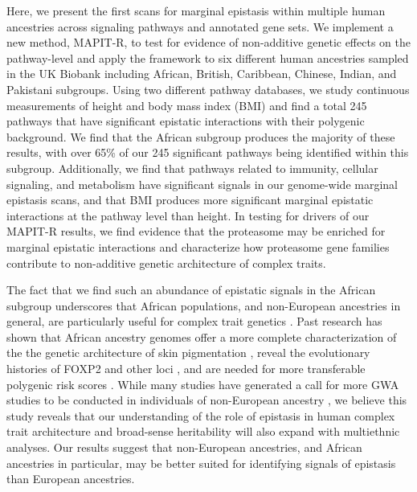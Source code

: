 \documentclass[10pt,a4paper]{article}
\begin{document}
Here, we present the first scans for marginal epistasis within multiple human ancestries across signaling pathways and annotated gene sets. We implement a new method, MAPIT-R, to test for evidence of non-additive genetic effects on the pathway-level and apply the framework to six different human ancestries sampled in the UK Biobank including African, British, Caribbean, Chinese, Indian, and Pakistani subgroups. Using two different pathway databases, we study continuous measurements of height and body mass index (BMI) and find a total 245 pathways that have significant epistatic interactions with their polygenic background. We find that the African subgroup produces the majority of these results, with over 65\% of our 245 significant pathways being identified within this subgroup. Additionally, we find that pathways related to immunity, cellular signaling, and metabolism have significant signals in our genome-wide marginal epistasis scans, and that BMI produces more significant marginal epistatic interactions at the pathway level than height. In testing for drivers of our MAPIT-R results, we find evidence that the proteasome may be enriched for marginal epistatic interactions and characterize how proteasome gene families contribute to non-additive genetic architecture of complex traits. 

The fact that we find such an abundance of epistatic signals in the African subgroup underscores that African populations, and non-European ancestries in general, are particularly useful for complex trait genetics \cite{Dumitrescu2011,Rotimi2017,Choudhury2018,Martin2018,Mogil2018,Bien2019,Kuchenbaecker2019,Wojcik2019,Zhong2019,Bentley2020}. Past research has shown that African ancestry genomes offer a more complete characterization of the the genetic architecture of skin pigmentation \cite{Martin2017b,Crawford2017b}, reveal the evolutionary histories of FOXP2 and other loci \cite{Atkinson2018,Sugden2018}, and are needed for more transferable polygenic risk scores \cite{Duncan2019,Marnetto2020}. While many studies have generated a call for more GWA studies to be conducted in individuals of non-European ancestry  \cite{Need2009,Popejoy2016,Gurdasani2019,Martin2019,Sirugo2019}, we believe this study reveals that our understanding of the role of epistasis in human complex trait architecture and broad-sense heritability will also expand with multiethnic analyses. Our results suggest that non-European ancestries, and African ancestries in particular, may be better suited for identifying signals of epistasis than European ancestries. 
\end{document}
